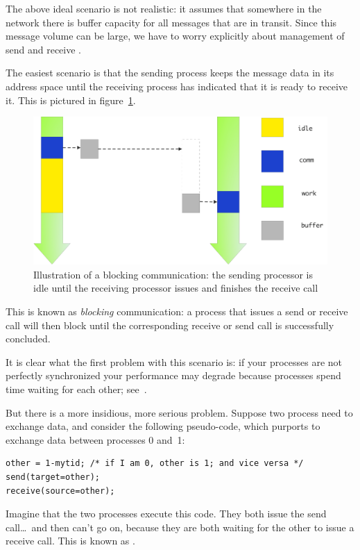 The above ideal scenario is not realistic: it assumes that somewhere
in the network there is buffer capacity for all messages that are in
transit. Since this message volume can be large, we have to worry
explicitly about management of send and receive .

The easiest scenario is that the sending process keeps the message
data in its address space until the receiving process has indicated
that it is ready to receive it. This is pictured in
figure~\ref{fig:send-blocking}.
\begin{figure}[ht]
\includegraphics[scale=.1]{graphics/send-blocking}
\caption{Illustration of a blocking communication: the sending processor is idle until the receiving processor issues and finishes the receive call}
\label{fig:send-blocking}
\end{figure}
This is known as \emph{blocking} communication: a process that issues
a send or receive call will then block until the corresponding receive
or send call is successfully concluded.

It is clear what the first problem with this scenario is: if your
processes are not perfectly synchronized your performance may degrade
because processes spend time waiting for each other;
see~. 

But there is a more insidious, more serious problem.
Suppose two process need to exchange data, and consider the following
pseudo-code, which purports to exchange data between processes 0 and~1:
\begin{verbatim}
other = 1-mytid; /* if I am 0, other is 1; and vice versa */
send(target=other);
receive(source=other);
\end{verbatim}
Imagine that the two processes execute this code. They both issue the
send call\ldots\ and then can't go on, because they are both waiting
for the other to issue a receive call. This is known
as .

